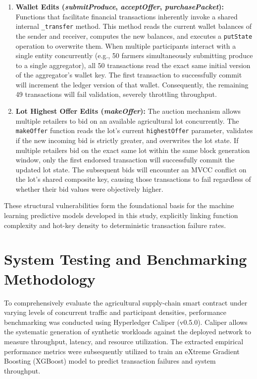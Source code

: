 \documentclass[manuscript,screen]{acmart}
\begin{document}
\begin{enumerate}
    \item \textbf{Wallet Edits (\textit{submitProduce}, \textit{acceptOffer}, \textit{purchasePacket}):} Functions that facilitate financial transactions inherently invoke a shared internal \texttt{\_transfer} method. This method reads the current wallet balances of the sender and receiver, computes the new balances, and executes a \texttt{putState} operation to overwrite them. When multiple participants interact with a single entity concurrently (e.g., 50 farmers simultaneously submitting produce to a single aggregator), all 50 transactions read the exact same initial version of the aggregator's wallet key. The first transaction to successfully commit will increment the ledger version of that wallet. Consequently, the remaining 49 transactions will fail validation, severely throttling throughput.
    
    \item \textbf{Lot Highest Offer Edits (\textit{makeOffer}):} The auction mechanism allows multiple retailers to bid on an available agricultural lot concurrently. The \texttt{makeOffer} function reads the lot's current \texttt{highestOffer} parameter, validates if the new incoming bid is strictly greater, and overwrites the lot state. If multiple retailers bid on the exact same lot within the same block generation window, only the first endorsed transaction will successfully commit the updated lot state. The subsequent bids will encounter an MVCC conflict on the lot's shared composite key, causing those transactions to fail regardless of whether their bid values were objectively higher.
\end{enumerate}

These structural vulnerabilities form the foundational basis for the machine learning predictive models developed in this study, explicitly linking function complexity and hot-key density to deterministic transaction failure rates.


\section{System Testing and Benchmarking Methodology}
To comprehensively evaluate the agricultural supply-chain smart contract under varying levels of concurrent traffic and participant densities, performance benchmarking was conducted using Hyperledger Caliper (v0.5.0). Caliper allows the systematic generation of synthetic workloads against the deployed network to measure throughput, latency, and resource utilization. The extracted empirical performance metrics were subsequently utilized to train an eXtreme Gradient Boosting (XGBoost) model to predict transaction failures and system throughput.
\end{document}
